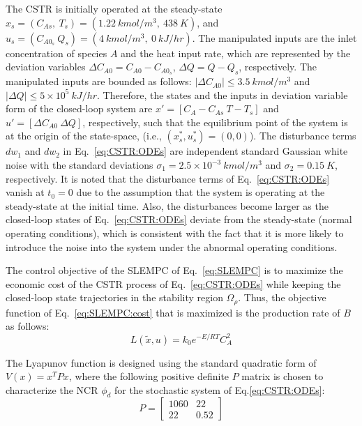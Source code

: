 \documentclass[letterpaper, 10pt, conference]{ieeeconf}
\begin{document}
The CSTR is initially operated at the steady-state $x_s=(C_{As}, ~T_s) = (1.22 ~kmol/m^3, ~438 ~K)$, and $u_s=(C_{A0_s} ~ Q_s)=(4 ~kmol/m^3, ~0 ~kJ/hr)$. The manipulated inputs are the inlet concentration of species $A$ and the heat input rate, which are represented by the deviation variables $\Delta C_{A0} = C_{A0}-C_{A0_s}$, $\Delta Q= Q- Q_s$, respectively. The manipulated inputs are bounded as follows: $\vert \Delta C_{A0} \vert \leq 3.5~ kmol/m^3$ and $\vert \Delta Q \vert \leq 5 \times 10^5~ kJ/hr$. Therefore, the states and the inputs in deviation variable form of the closed-loop system are $x'=[C_A- C_{As} ~T-T_s]$ and $u'=[\Delta C_{A0} ~ \Delta Q]$, respectively, such that the equilibrium point of the system is at the origin of the state-space, (i.e., $(x_s^*, u_s^*)=(0,0)$). The disturbance terms $dw_1$ and $dw_2$ in Eq.~\ref{eq:CSTR:ODEs} are independent standard Gaussian white noise with the standard deviations $\sigma_1= 2.5 \times 10^{-3}~ kmol/m^3$ and $\sigma_2=0.15 ~ K$, respectively. It is noted that the disturbance terms of Eq.~\ref{eq:CSTR:ODEs} vanish at $t_0=0$ due to the assumption that the system is operating at the steady-state at the initial time. Also, the disturbances become larger as the closed-loop states of Eq.~\ref{eq:CSTR:ODEs} deviate from the steady-state (normal operating conditions), which is consistent with the fact that it is more likely to introduce the noise into the system under the abnormal operating conditions.

The control objective of the SLEMPC of Eq.~\ref{eq:SLEMPC} is to maximize the economic cost of the CSTR
process of Eq.~\ref{eq:CSTR:ODEs} while keeping the closed-loop state trajectories
in the stability region $\Omega_{\rho}$. Thus, the objective function of Eq.~\ref{eq:SLEMPC:cost} that is maximized is the production rate of $B$ as follows:
\begin{equation}\label{obj_func}
L(\tilde{x},u)=  k_0 e^{-E/RT}C_{A}^2
\end{equation}


The Lyapunov function is designed using the standard quadratic form of $V(x)=x^TPx$, where the following positive definite $P$ matrix is chosen to characterize the NCR $\phi_d$ for the stochastic system of Eq.\ref{eq:CSTR:ODEs}:
\begin{equation}
P = \left[\begin{array}{cc}
1060 & 22 \\
22   & 0.52
\end{array}\right]
\end{equation}
\end{document}
